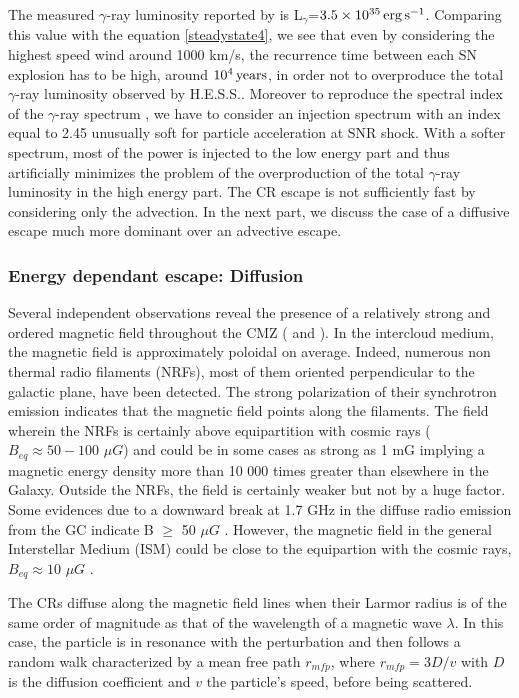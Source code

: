 \documentclass[a4paper,fleqn,usenatbib]{mnras}
\begin{document}
The measured $\gamma$-ray luminosity reported by \citep{2006Natur.439..695A} is L$_\gamma$=$3.5\times 10^{35} \, \rm erg \, s^{-1}$. Comparing this value with the equation \ref{steadystate4}, we see that even by considering the highest speed wind around 1000 km/s, the recurrence time between each SN explosion has to be high, around $10\rm^4 \, years$, in order not to overproduce the total $\gamma$-ray luminosity observed by H.E.S.S.. Moreover to reproduce the spectral index of the $\gamma$-ray spectrum \citep{2006Natur.439..695A}, we have to consider an injection spectrum with an index equal to 2.45 unusually soft for particle acceleration at SNR shock. With a softer spectrum, most of the power is injected to the low energy part and thus artificially minimizes the problem of the overproduction of the total $\gamma$-ray luminosity in the high energy part.
The CR escape is not sufficiently fast by considering only the advection. In the next part, we discuss the case of a diffusive escape much more dominant over an advective escape. 



\subsubsection{Energy dependant escape: Diffusion} 
\label{diffusion}
Several independent observations reveal the presence of a relatively strong and ordered magnetic field throughout the CMZ (\cite{2011IAUS..271..170F} and \cite{2014arXiv1406.7859M}). In the intercloud medium, the magnetic field is approximately poloidal on average. Indeed, numerous non thermal radio filaments (NRFs),  most of them oriented perpendicular to the galactic plane, have been detected. The strong polarization of their synchrotron emission indicates that the magnetic field points along the filaments. The field wherein the NRFs is certainly above equipartition with cosmic rays ($B_{eq}\approx 50-100$ $\mu G$) and could be in some cases as strong as 1 mG implying a magnetic energy density more than 10 000 times greater than elsewhere in the Galaxy. Outside the NRFs, the field is certainly weaker but not by a huge factor. Some evidences due to a downward break at 1.7 GHz in the diffuse radio emission from the GC indicate B $\geqslant$ 50 $\mu G$ \citep{2011MNRAS.413..763C}. However, the magnetic field in the general Interstellar Medium (ISM) could be close to the equipartion with the cosmic rays, $B_{eq}\approx 10$ $\mu G$ \citep{2005ApJ...626L..23L}.

The CRs diffuse along the magnetic field lines when their Larmor radius is of the same order of magnitude as that of the wavelength of a magnetic wave $\lambda$. In this case, the particle is in resonance with the perturbation and then follows a random walk characterized by a mean free path $r_{mfp}$, where $r_{mfp}=3D/v$ with $D$ is the diffusion coefficient and $v$ the particle's speed, before being scattered. 
\end{document}
